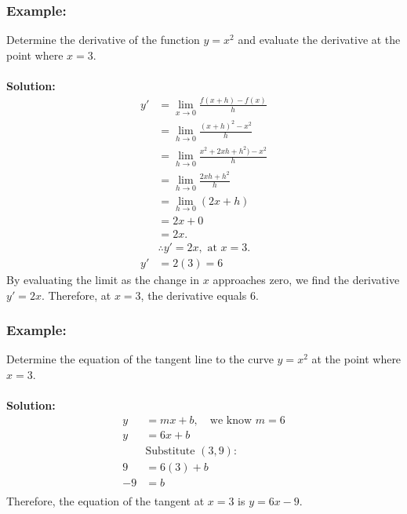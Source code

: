 \documentclass{article}
\begin{document}
\subsubsection*{Example:}
Determine the derivative of the function $y=x^2$ and evaluate the derivative at the point where $x=3$.\\ \\ 
\textbf{Solution:}
\begin{align*}
    y' &= \lim_{x \to 0} \frac{f(x+h)-f(x)}{h}\\
    &= \lim_{h \to 0} \frac{(x+h)^2-x^2}{h}\\
    &= \lim_{h \to 0} \frac{x^2+2xh+h^2)-x^2}{h}\\
    &= \lim_{h \to 0} \frac{2xh+h^2}{h}\\
    &= \lim_{h \to 0} (2x+h)\\
    &= 2x + 0\\
    &= 2x.\\
    & \therefore y'=2x, \text{ at } x=3. \\
    y' &=2(3)=6 
\end{align*}
By evaluating the limit as the change in \( x \) approaches zero, we find the derivative \( y' = 2x \). Therefore, at \( x = 3 \), the derivative equals 6.
\newpage
\subsubsection*{Example:}
Determine the equation of the tangent line to the curve $y=x^2$ at the point where $x=3$. \\ \\ 
\textbf{Solution:}
\begin{align*}
    y &= mx + b, \quad \text{we know } m = 6 \\
    y &= 6x + b \\
    & \text{Substitute }(3, 9): \\
    9 &= 6(3) + b \\
    -9 &= b \\
\end{align*}
Therefore, the equation of the tangent at \(x = 3\) is \(y = 6x - 9\).
\end{document}
